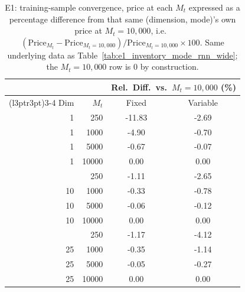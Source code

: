 \begin{table}

\caption{\label{tab:e1_inventory_mode_rnn_relative}E1: training-sample convergence, price at each $M_t$ expressed as a percentage difference from that same (dimension, mode)'s own price at $M_t=10{,}000$, i.e.\ $(\text{Price}_{M_t} - \text{Price}_{M_t=10{,}000})/\text{Price}_{M_t=10{,}000} \times 100$. Same underlying data as Table~\ref{tab:e1_inventory_mode_rnn_wide}; the $M_t=10{,}000$ row is $0$ by construction.}
\footnotesize
\setlength{\tabcolsep}{4pt}
\centering
\begin{tabular}[t]{rrcc}
\toprule
\multicolumn{2}{c}{ } & \multicolumn{2}{c}{Rel.\ Diff.\ vs.\ $M_t=10{,}000$ (\%)} \\
\cmidrule(l{3pt}r{3pt}){3-4}
Dim & $M_t$ & Fixed & Variable\\
\midrule
1 & 250 & -11.83 & -2.69\\
1 & 1000 & -4.90 & -0.70\\
1 & 5000 & -0.67 & -0.07\\
1 & 10000 & 0.00 & 0.00\\
\addlinespace
10 & 250 & -1.11 & -2.65\\
10 & 1000 & -0.33 & -0.78\\
10 & 5000 & -0.06 & -0.12\\
10 & 10000 & 0.00 & 0.00\\
\addlinespace
25 & 250 & -1.17 & -4.12\\
25 & 1000 & -0.35 & -1.14\\
25 & 5000 & -0.05 & -0.27\\
25 & 10000 & 0.00 & 0.00\\
\bottomrule
\end{tabular}
\end{table}
